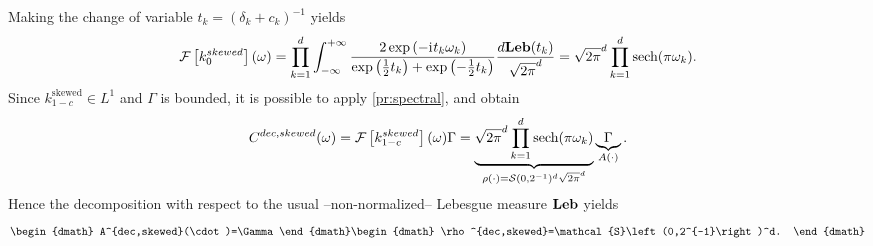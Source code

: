 Making the change of variable $t_k=(\delta_k+c_k)^{-1}$ yields
\begin{dmath*}
    \FT{k_0^{skewed}}(\omega)
    = \prod_{k=1}^d\int_{-\infty}^{+\infty} \frac{2 \exp\left(-\iu t_k
    \omega_k\right)}{\exp\left(\frac{1}{2} t_k \right) + \exp\left(-\frac{1}{2}
    t_k \right)} \frac{d\Leb(t_k)}{\sqrt{2\pi}^d}
    =\sqrt{2\pi}^d\prod_{k=1}^d\sech(\pi\omega_k).
\end{dmath*}
Since $k^{\text{skewed}}_{1-c}\in L^1$ and $\Gamma$ is bounded, it is possible
to apply \cref{pr:spectral}, and obtain
\begin{dmath*}
    C^{dec,skewed}(\omega) 
    =\FT{k_{1-c}^{skewed}}(\omega)\Gamma
    =\underbrace{\sqrt{2\pi}^d\prod_{k=1}^d\sech(\pi \omega_k)}_{\rho(\cdot) =
    \mathcal{S}(0, 2^{-1})^d\sqrt{2 \pi}^d}\underbrace{\Gamma}_{A(\cdot)}.
\end{dmath*}
Hence the decomposition with respect to the usual --non-normalized-- Lebesgue
measure $\mathbf{Leb}$ yields
\begin{dgroup}
    \begin{dmath}
        A^{dec,skewed}(\cdot)=\Gamma
    \end{dmath}
    \begin{dmath}
        \rho^{dec,skewed}=\mathcal{S}\left(0,2^{-1}\right)^d.
    \end{dmath}
\end{dgroup}

